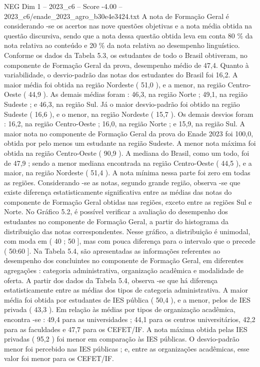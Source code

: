 \begin{textsample}{NEG Dim 1 – 2023\_c6 – Score -4.00 – 2023\_c6/enade\_2023\_agro\_b30e4e3424.txt}
A nota de Formação Geral é considerando -se os acertos nas nove questões objetivas e a nota média obtida na questão discursiva, sendo que a nota dessa questão obtida leva em conta 80 \% da nota relativa ao conteúdo e 20 \% da nota relativa ao desempenho linguístico.
Conforme os dados da Tabela 5.3, os estudantes de todo o Brasil obtiveram, no componente de Formação Geral da prova, desempenho médio de 47,4.
Quanto à variabilidade, o desvio-padrão das notas dos estudantes do Brasil foi 16,2.
A maior média foi obtida na região Nordeste ( 51,0 ), e a menor, na região Centro-Oeste ( 44,9 ).
As demais médias foram : 46,3, na região Norte ; 49,1, na região Sudeste ; e 46,3, na região Sul.
Já o maior desvio-padrão foi obtido na região Sudeste ( 16,6 ), e o menor, na região Nordeste ( 15,7 ).
Os demais desvios foram : 16,2, na região Centro-Oeste ; 16,0, na região Norte ; e 15,9, na região Sul.
A maior nota no componente de Formação Geral da prova do Enade 2023 foi 100,0, obtida por pelo menos um estudante na região Sudeste.
A menor nota máxima foi obtida na região Centro-Oeste ( 90,9 ).
A mediana do Brasil, como um todo, foi de 47,9 ; sendo a menor mediana encontrada na região Centro-Oeste ( 44,5 ), e a maior, na região Nordeste ( 51,4 ).
A nota mínima nessa parte foi zero em todas as regiões.
Considerando -se as notas, segundo grande região, observa -se que existe diferença estatisticamente significativa entre as médias das notas do componente de Formação Geral obtidas nas regiões, exceto entre as regiões Sul e Norte.
No Gráfico 5.2, é possível verificar a avaliação do desempenho dos estudantes no componente de Formação Geral, a partir do histograma da distribuição das notas correspondentes.
Nesse gráfico, a distribuição é unimodal, com moda em ( 40 ; 50 ], mas com pouca diferença para o intervalo que o precede ( 50:60 ].
Na Tabela 5.4, são apresentadas as informações referentes ao desempenho dos concluintes no componente de Formação Geral, em diferentes agregações : categoria administrativa, organização acadêmica e modalidade de oferta.
A partir dos dados da Tabela 5.4, observa -se que há diferença estatisticamente entre as médias dos tipos de categoria administrativa.
A maior média foi obtida por estudantes de IES pública ( 50,4 ), e a menor, pelos de IES privada ( 43,3 ).
Em relação às médias por tipos de organização acadêmica, encontra -se : 49,4 para as universidades ; 44,1 para os centros universitários, 42,2 para as faculdades e 47,7 para os CEFET/IF.
A nota máxima obtida pelas IES privadas ( 95,2 ) foi menor em comparação às IES públicas.
O desvio-padrão menor foi percebido nas IES públicas ; e, entre as organizações acadêmicas, esse valor foi menor para os CEFET/IF.

\end{textsample}

